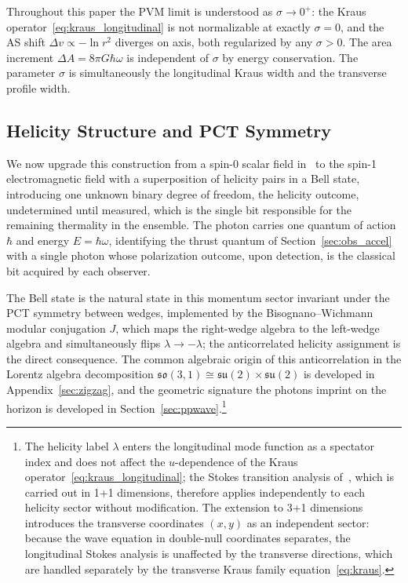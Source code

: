 \documentclass[12pt,a4paper]{article}
\begin{document}
Throughout this paper the PVM limit is understood as 
$\sigma \to 0^+$: the Kraus 
operator~\eqref{eq:kraus_longitudinal} is not 
normalizable at exactly $\sigma = 0$, and the AS 
shift $\Delta v \propto -\ln r^2$ diverges on axis, 
both regularized by any $\sigma > 0$. The area 
increment $\Delta A = 8\pi G\hbar\omega$ is 
independent of $\sigma$ by energy conservation. 
The parameter $\sigma$ is simultaneously the 
longitudinal Kraus width and the transverse 
profile width.

\subsection{Helicity Structure and PCT Symmetry}

We now upgrade this construction from a spin-0 scalar field 
in~\cite{player2025driving} to the spin-1 electromagnetic 
field with a superposition of helicity pairs in a Bell state, 
introducing one unknown binary degree of freedom, the 
helicity outcome, undetermined until measured, which is 
the single bit responsible for the remaining thermality in 
the ensemble. The photon carries one quantum of action $\hbar$ 
and energy $E = \hbar\omega$, identifying the thrust quantum 
of Section~\ref{sec:obs_accel} with a single photon whose 
polarization outcome, upon detection, is the classical bit 
acquired by each observer.

The Bell state is the natural state in this momentum sector 
invariant under the PCT symmetry between wedges, implemented 
by the Bisognano--Wichmann ~\cite{bisognano1975duality} modular conjugation
$J$, which maps 
the right-wedge algebra to the left-wedge algebra and 
simultaneously flips $\lambda \to -\lambda$; the anticorrelated 
helicity assignment is the direct consequence. The common 
algebraic origin of this anticorrelation in the Lorentz algebra 
decomposition $\mathfrak{so}(3,1) \cong \mathfrak{su}(2) \times 
\mathfrak{su}(2)$ is developed in Appendix~\ref{sec:zigzag}, 
and the geometric signature the photons imprint on the horizon 
is developed in Section~\ref{sec:ppwave}.\footnote{The 
helicity label $\lambda$ enters the longitudinal 
mode function as a spectator index and does not affect 
the $u$-dependence of the Kraus 
operator~\eqref{eq:kraus_longitudinal}; the Stokes 
transition analysis of~\cite{player2025driving}, which 
is carried out in 1+1 dimensions, therefore 
applies independently to each helicity sector without 
modification. The extension to 3+1 dimensions introduces 
the transverse coordinates $(x,y)$ as an independent 
sector: because the wave equation in double-null 
coordinates separates, the longitudinal Stokes analysis 
is unaffected by the transverse directions, which are 
handled separately by the transverse Kraus 
family equation~\eqref{eq:kraus}.}
\end{document}
